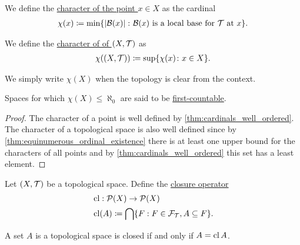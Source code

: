 \begin{definition}\label{def:topological_space_character}
  We define the \ul{character of the point $x \in X$} as the cardinal
  \begin{align*}
    \chi(x) \coloneqq \min \{ \left\vert \mathcal B(x) \right\vert \colon \mathcal B(x) \text{ is a local base for } \mathcal T \text{ at } x \}.
  \end{align*}

  We define the \ul{character of of $(X, \mathcal T)$} as
  \begin{align*}
    \chi((X, \mathcal T)) \coloneqq \sup \{ \chi(x) \colon x \in X \}.
  \end{align*}

  We simply write $\chi(X)$ when the topology is clear from the context.

  Spaces for which $\chi(X) \leq \aleph_0$ are said to be \ul{first-countable}.
\end{definition}
\begin{proof}
  The character of a point is well defined by \cref{thm:cardinals_well_ordered}. The character of a topological space is also well defined since by \cref{thm:equinumerous_ordinal_existence} there is at least one upper bound for the characters of all points and by \cref{thm:cardinals_well_ordered} this set has a least element.
\end{proof}

\begin{definition}\label{def:closure_operator}\cite[33]{Engelking1989}
  Let $(X, \mathcal T)$ be a topological space. Define the \ul{closure operator}
  \begin{align*}
    &\operatorname{cl}: \operatorname{\mathcal P}(X) \to \operatorname{\mathcal P}(X) \\
    &\operatorname{cl}(A) \coloneqq \bigcap \{ F : F \in \mathcal F_{\mathcal T}, A \subseteq F \}.
  \end{align*}
\end{definition}

\begin{proposition}\label{thm:set_closed_iff_matches_closure}
  A set $A$ is a topological space is closed if and only if $A = \operatorname{cl} A$.
\end{proposition}

